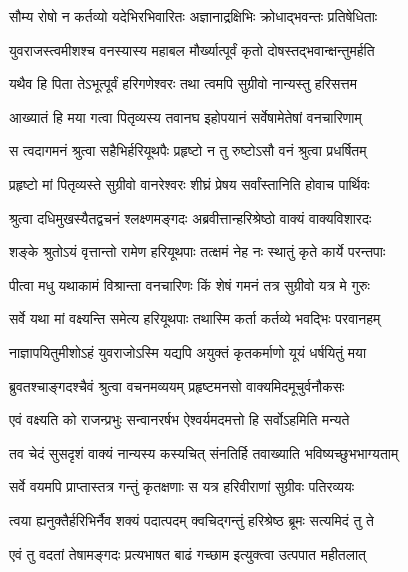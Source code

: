 \twolineshloka
{सौम्य रोषो न कर्तव्यो यदेभिरभिवारितः}
{अज्ञानाद्रक्षिभिः क्रोधाद्भवन्तः प्रतिषेधिताः} %

\twolineshloka
{युवराजस्त्वमीशश्च वनस्यास्य महाबल}
{मौर्ख्यात्पूर्वं कृतो दोषस्तद्भवान्क्षन्तुमर्हति} %

\twolineshloka
{यथैव हि पिता तेऽभूत्पूर्वं हरिगणेश्वरः}
{तथा त्वमपि सुग्रीवो नान्यस्तु हरिसत्तम} %

\twolineshloka
{आख्यातं हि मया गत्वा पितृव्यस्य तवानघ}
{इहोपयानं सर्वेषामेतेषां वनचारिणाम्} %

\twolineshloka
{स त्वदागमनं श्रुत्वा सहैभिर्हरियूथपैः}
{प्रहृष्टो न तु रुष्टोऽसौ वनं श्रुत्वा प्रधर्षितम्} %

\twolineshloka
{प्रहृष्टो मां पितृव्यस्ते सुग्रीवो वानरेश्वरः}
{शीघ्रं प्रेषय सर्वांस्तानिति होवाच पार्थिवः} %

\twolineshloka
{श्रुत्वा दधिमुखस्यैतद्वचनं श्लक्ष्णमङ्गदः}
{अब्रवीत्तान्हरिश्रेष्ठो वाक्यं वाक्यविशारदः} %

\twolineshloka
{शङ्के श्रुतोऽयं वृत्तान्तो रामेण हरियूथपाः}
{तत्क्षमं नेह नः स्थातुं कृते कार्ये परन्तपाः} %

\twolineshloka
{पीत्वा मधु यथाकामं विश्रान्ता वनचारिणः}
{किं शेषं गमनं तत्र सुग्रीवो यत्र मे गुरुः} %

\twolineshloka
{सर्वे यथा मां वक्ष्यन्ति समेत्य हरियूथपाः}
{तथास्मि कर्ता कर्तव्ये भवद्भिः परवानहम्} %

\twolineshloka
{नाज्ञापयितुमीशोऽहं युवराजोऽस्मि यद्यपि}
{अयुक्तं कृतकर्माणो यूयं धर्षयितुं मया} %

\twolineshloka
{ब्रुवतश्चाङ्गदश्चैवं श्रुत्वा वचनमव्ययम्}
{प्रहृष्टमनसो वाक्यमिदमूचुर्वनौकसः} %

\twolineshloka
{एवं वक्ष्यति को राजन्प्रभुः सन्वानरर्षभ}
{ऐश्वर्यमदमत्तो हि सर्वोऽहमिति मन्यते} %

\twolineshloka
{तव चेदं सुसदृशं वाक्यं नान्यस्य कस्यचित्}
{संनतिर्हि तवाख्याति भविष्यच्छुभभाग्यताम्} %

\twolineshloka
{सर्वे वयमपि प्राप्तास्तत्र गन्तुं कृतक्षणाः}
{स यत्र हरिवीराणां सुग्रीवः पतिरव्ययः} %

\twolineshloka
{त्वया ह्यनुक्तैर्हरिभिर्नैव शक्यं पदात्पदम्}
{क्वचिद्गन्तुं हरिश्रेष्ठ ब्रूमः सत्यमिदं तु ते} %

\twolineshloka
{एवं तु वदतां तेषामङ्गदः प्रत्यभाषत}
{बाढं गच्छाम इत्युक्त्वा उत्पपात महीतलात्} %

